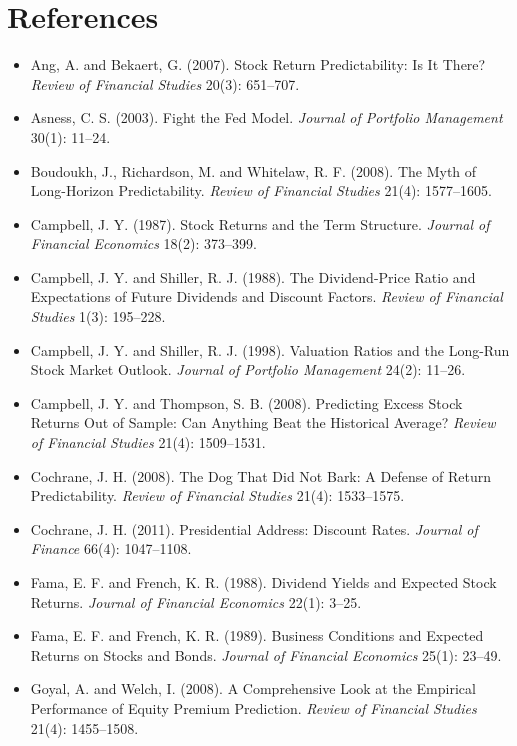 \section*{References}

\begin{itemize}
  \item Ang, A. and Bekaert, G. (2007). Stock Return Predictability: Is It There? \emph{Review of Financial Studies} 20(3): 651--707.
  \item Asness, C. S. (2003). Fight the Fed Model. \emph{Journal of Portfolio Management} 30(1): 11--24.
  \item Boudoukh, J., Richardson, M. and Whitelaw, R. F. (2008). The Myth of Long-Horizon Predictability. \emph{Review of Financial Studies} 21(4): 1577--1605.
  \item Campbell, J. Y. (1987). Stock Returns and the Term Structure. \emph{Journal of Financial Economics} 18(2): 373--399.
  \item Campbell, J. Y. and Shiller, R. J. (1988). The Dividend-Price Ratio and Expectations of Future Dividends and Discount Factors. \emph{Review of Financial Studies} 1(3): 195--228.
  \item Campbell, J. Y. and Shiller, R. J. (1998). Valuation Ratios and the Long-Run Stock Market Outlook. \emph{Journal of Portfolio Management} 24(2): 11--26.
  \item Campbell, J. Y. and Thompson, S. B. (2008). Predicting Excess Stock Returns Out of Sample: Can Anything Beat the Historical Average? \emph{Review of Financial Studies} 21(4): 1509--1531.
  \item Cochrane, J. H. (2008). The Dog That Did Not Bark: A Defense of Return Predictability. \emph{Review of Financial Studies} 21(4): 1533--1575.
  \item Cochrane, J. H. (2011). Presidential Address: Discount Rates. \emph{Journal of Finance} 66(4): 1047--1108.
  \item Fama, E. F. and French, K. R. (1988). Dividend Yields and Expected Stock Returns. \emph{Journal of Financial Economics} 22(1): 3--25.
  \item Fama, E. F. and French, K. R. (1989). Business Conditions and Expected Returns on Stocks and Bonds. \emph{Journal of Financial Economics} 25(1): 23--49.
  \item Goyal, A. and Welch, I. (2008). A Comprehensive Look at the Empirical Performance of Equity Premium Prediction. \emph{Review of Financial Studies} 21(4): 1455--1508.

\end{itemize}
